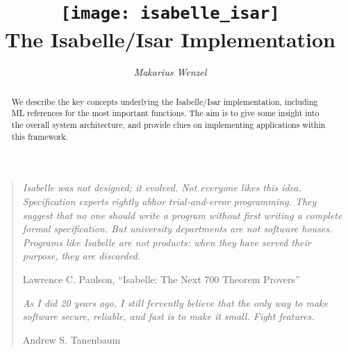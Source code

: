 \documentclass[12pt,a4paper,fleqn]{report}
\title{\texttt{[image: isabelle\_isar]}
  \\[4ex] The Isabelle/Isar Implementation}
\author{\emph{Makarius Wenzel}}
\begin{document}
\maketitle 

\begin{abstract}
  We describe the key concepts underlying the Isabelle/Isar
  implementation, including ML references for the most important
  functions.  The aim is to give some insight into the overall system
  architecture, and provide clues on implementing applications within
  this framework.
\end{abstract}

\vspace*{2.5cm}
\begin{quote}
  
  {\small\em Isabelle was not designed; it evolved.  Not everyone
    likes this idea.  Specification experts rightly abhor
    trial-and-error programming.  They suggest that no one should
    write a program without first writing a complete formal
    specification. But university departments are not software houses.
    Programs like Isabelle are not products: when they have served
    their purpose, they are discarded.}
  
  Lawrence C. Paulson, ``Isabelle: The Next 700 Theorem Provers''

  \vspace*{1cm}
  
  {\small\em As I did 20 years ago, I still fervently believe that the
    only way to make software secure, reliable, and fast is to make it
    small.  Fight features.}
  
  Andrew S. Tanenbaum

\end{quote}

\thispagestyle{empty}\clearpage

\tableofcontents
\listoffigures
\clearfirst

%








\appendix


\begingroup
\tocentry{\bibname}
 \small\raggedright\frenchspacing

\endgroup


\tocentry{\indexname}
\printindex
\end{document}
